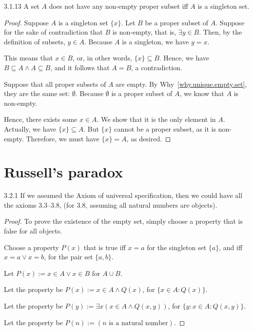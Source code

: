 \begin{exercise}{3.1.13}
	A set $A$ does not have any non-empty proper subset iff $A$ is a singleton set.
\end{exercise}
\begin{proof}
	\myifbox Suppose $A$ is a singleton set $\{x\}$. Let $B$ be a proper subset of $A$. Suppose for the sake of contradiction that $B$ is non-empty, that is, $\exists y \in B$. Then, by the definition of subsets, $y \in A$. Because $A$ is a singleton, we have $y = x$.
	
	This means that $x \in B$, or, in other words, $\{x\} \subseteq B$. Hence, we have $B \subseteq A \wedge A \subseteq B$, and it follows that $A = B$, a contradiction.
	
	\myoifbox Suppose that all proper subsets of $A$ are empty. By Why~\ref{why.unique.empty.set}, they are the same set: $\emptyset$. Because $\emptyset$ is a proper subset of $A$, we know that $A$ is non-empty.
	
	Hence, there exists some $x \in A$. We show that it is the only element in $A$. Actually, we have $\{x\} \subseteq A$. But $\{x\}$ cannot be a proper subset, as it is non-empty. Therefore, we must have $\{x\} = A$, as desired.
\end{proof}

\section{Russell's paradox}

\begin{exercise}{3.2.1}
	If we assumed the Axiom of universal specification, then we could have all the axioms 3.3--3.8, (for 3.8, assuming all natural numbers are objects).
\end{exercise}
\begin{proof}
 To prove the existence of the empty set, simply choose a property that is false for all objects.

 Choose a property $P(x)$ that is true iff $x = a$ for the singleton set $\{a\}$, and iff $x = a \vee x = b$, for the pair set $\{a,b\}$.

 Let $P(x) := x \in A \vee x \in B$ for $A \cup B$.

 Let the property be $P(x):= x \in A \wedge Q(x)$, for $\{x \in A : Q(x)\}$.

 Let the property be $P(y):= \exists x(x \in A \wedge Q(x,y))$, for $\{y: x \in A: Q(x,y)\}$.

 Let the property be $P(n):= (n \text{ is a natural number})$.
\end{proof}

